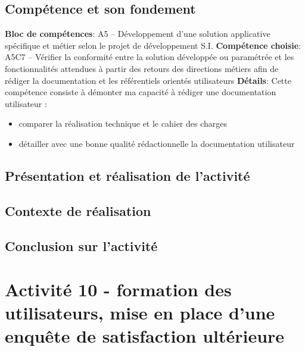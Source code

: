 \documentclass[a4paper, 11pt]{report}
\begin{document}
\subsection{Compétence et son fondement}
\textbf{Bloc de compétences}: A5 – Développement d’une solution applicative spécifique et métier selon le projet de développement S.I.
\newline
\textbf{Compétence choisie}: A5C7 – Vérifier la conformité entre la solution développée ou paramétrée et les fonctionnalités attendues à partir des retours des directions métiers afin de rédiger la documentation et les référentiels orientés utilisateurs
\newline
\textbf{Détails}: Cette compétence consiste à démonter ma capacité à rédiger une documentation utilisateur :
\begin{itemize}
  \item comparer la réalisation technique et le cahier des charges
  \item détailler avec une bonne qualité rédactionnelle la documentation utilisateur
\end{itemize}
\subsection{Présentation et réalisation de l'activité}
\subsection{Contexte de réalisation}
\subsection{Conclusion sur l'activité}

\section{Activité 10 - formation des utilisateurs, mise en place d’une enquête de satisfaction ultérieure}
\end{document}
